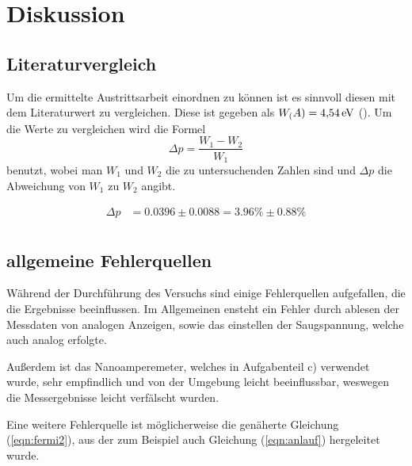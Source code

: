 \section{Diskussion}
\subsection{Literaturvergleich}
Um die ermittelte Austrittsarbeit einordnen zu können ist es sinnvoll diesen mit dem Literaturwert zu vergleichen. Diese ist gegeben als $W_\text(A) = \SI{4,54}{\eV}$ (\cite{formel-sammlung}). Um die Werte 
zu vergleichen wird die Formel 
\begin{equation*}
    \Delta p = \frac{W_1-W_2}{W_1}
\end{equation*}
\noindent
benutzt, wobei man $W_1$ und $W_2$ die zu untersuchenden Zahlen sind und $\Delta p$ die Abweichung von $W_1$ zu $W_2$ angibt.

\begin{align*}
    \Delta p &= 0.0396 \pm 0.0088 = 3.96\% \pm 0.88\% \\
\end{align*}



\subsection{allgemeine Fehlerquellen}
Während der Durchführung des Versuchs sind einige Fehlerquellen aufgefallen, die die Ergebnisse beeinflussen.
Im Allgemeinen ensteht ein Fehler durch ablesen der Messdaten von analogen Anzeigen, 
sowie das einstellen der Saugspannung, welche auch analog erfolgte.

\noindent
Außerdem ist das Nanoamperemeter, welches in Aufgabenteil c) verwendet wurde, sehr empfindlich und von der Umgebung leicht beeinflussbar,
weswegen die Messergebnisse leicht verfälscht wurden.

\noindent
Eine weitere Fehlerquelle ist möglicherweise die genäherte Gleichung (\ref{eqn:fermi2}), aus der zum Beispiel auch Gleichung (\ref{eqn:anlauf}) hergeleitet wurde.





